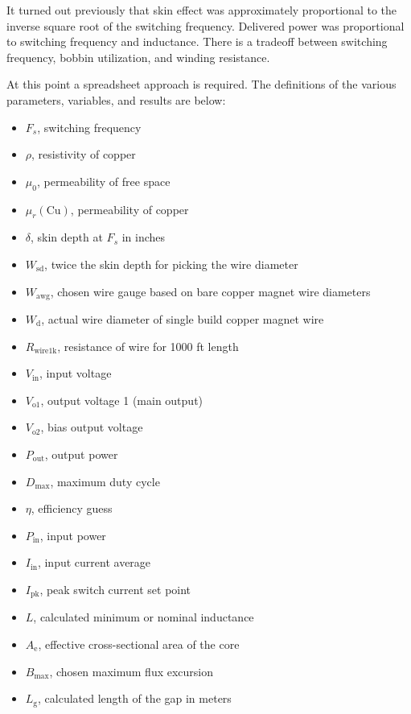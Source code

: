 \documentclass{article}
\begin{document}
It turned out previously that skin effect was approximately proportional to the inverse square root of the switching frequency.  Delivered power was proportional to switching frequency and inductance.  There is a tradeoff between switching frequency, bobbin utilization, and winding resistance.

At this point a spreadsheet approach is required.  The definitions of the various parameters, variables, and results are below:

\begin{itemize}
    \item $F_s$, switching frequency
    \item $\rho$, resistivity of copper
    \item $\mu_0$, permeability of free space
    \item $\mu_r (\text{Cu})$, permeability of copper
    \item $\delta$, skin depth at $F_s$ in inches
    \item $W_\text{sd}$, twice the skin depth for picking the wire diameter
    \item $W_\text{awg}$, chosen wire gauge based on bare copper magnet wire diameters
    \item $W_\text{d}$, actual wire diameter of single build copper magnet wire
    \item $R_\text{wire1k}$, resistance of wire for 1000 ft length
    \item $V_\text{in}$, input voltage
    \item $V_\text{o1}$, output voltage 1 (main output)
    \item $V_\text{o2}$, bias output voltage
    \item $P_\text{out}$, output power
    \item $D_\text{max}$, maximum duty cycle
    \item $\eta$, efficiency guess
    \item $P_\text{in}$, input power
    \item $I_\text{in}$, input current average
    \item $I_\text{pk}$, peak switch current set point
    \item $L$, calculated minimum or nominal inductance
    \item $A_\text{e}$, effective cross-sectional area of the core
    \item $B_\text{max}$, chosen maximum flux excursion
    \item $L_\text{g}$, calculated length of the gap in meters

\end{itemize}
\end{document}
